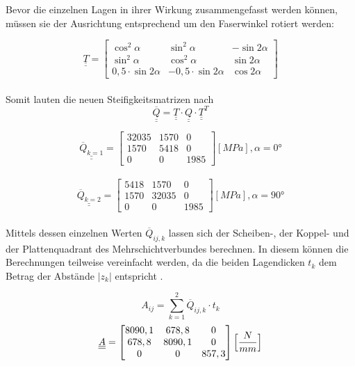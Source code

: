 \noindent Bevor die einzelnen Lagen in ihrer Wirkung zusammengefasst werden können, müssen sie der Ausrichtung entsprechend um den Faserwinkel rotiert werden:

\begin{equation}
	\underline{\underline{T}}=
	\begin{bmatrix}
		\cos^{2}\alpha&\sin^{2}\alpha&-\sin 2\alpha\\
		\sin^{2}\alpha&\cos^{2}\alpha&\sin 2\alpha\\
		0,5\cdot \sin2\alpha&-0,5\cdot\sin2\alpha&\cos 2\alpha
	\end{bmatrix}
\end{equation}\\

\noindent Somit lauten die neuen Steifigkeitsmatrizen nach 
\begin{equation}
	\overline{\underline{\underline{Q}}}=\underline{\underline{T}}\cdot \underline{\underline{Q}} \cdot \underline{\underline{T}}^{T}  
\end{equation}

\begin{equation}
\underline{\underline{\overline{Q}_{k=1}}}=
\begin{bmatrix}
	32035 & 1570 & 0\\
	1570 & 5418 & 0\\
	0 & 0 & 1985
\end{bmatrix} [MPa], \alpha = 0°
\end{equation}\\
\begin{equation}
	\underline{\underline{\overline{Q }_{k=2}}}=
	\begin{bmatrix}
		5418 & 1570 & 0\\
		1570 & 32035 & 0\\
		0 & 0 & 1985
	\end{bmatrix} [MPa], \alpha = 90°
\end{equation}\\

\noindent Mittels dessen einzelnen Werten $\overline{Q}_{ij, k}$ lassen sich der Scheiben-, der Koppel- und der Plattenquadrant des Mehrschichtverbundes berechnen. In diesem können die Berechnungen teilweise vereinfacht werden, da die beiden Lagendicken $t_{k}$ dem Betrag der Abstände $|z_{k}|$ entspricht \cite{item3}.

\begin{equation}
	A_{ij}= \sum_{k=1}^{2} \overline{Q}_{ij,k}\cdot t_{k}
\end{equation}
\begin{equation} \underline{\underline{A}}=
	\begin{bmatrix}
		8090,1 & 678,8 & 0\\
		678,8 & 8090,1 & 0\\
		0 & 0 & 857,3\\
	\end{bmatrix} \Bigl[\frac{N}{mm}\Bigr]
\end{equation}



